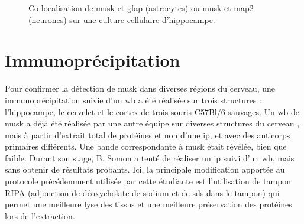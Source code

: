 \begin{figure}
\begin{subfigure}[h]{0.329\textwidth}
		\end{subfigure}
	\caption{Co-localisation de \gls{musk} et \gls{gfap} (astrocytes) ou \gls{musk} et \gls{map2} (neurones) sur une culture cellulaire d'hippocampe.}
	\label{fig:MuSKMAP2GFAP}
	\end{figure}
	\FloatBarrier

\section{Immunoprécipitation}
\label{sec:IPresultat}
	Pour confirmer la détection de \gls{musk} dans diverses régions du cerveau, une immunoprécipitation suivie d'un \gls{wb} a été réalisée sur trois structures : l'hippocampe, le cervelet et le cortex de trois souris C57Bl/6 sauvages. Un \gls{wb} de \gls{musk} a déjà été réalisée par une autre équipe sur diverses structures du cerveau \cite{Garcia-Osta2006}, mais à partir d'extrait total de protéines et non d'une \gls{ip}, et avec des anticorps primaires différents. Une bande correspondante à \gls{musk} était révélée, bien que faible. Durant son stage, B. Somon a tenté de réaliser un \gls{ip} suivi d'un \gls{wb}, mais sans obtenir de résultats probants. Ici, la principale modification apportée au protocole précédemment utilisée par cette étudiante est l'utilisation de tampon RIPA (adjonction de déoxycholate de sodium et de \acrshort{sds} dans le tampon) qui permet une meilleure lyse des tissus et une meilleure préservation des protéines lors de l'extraction.
	
